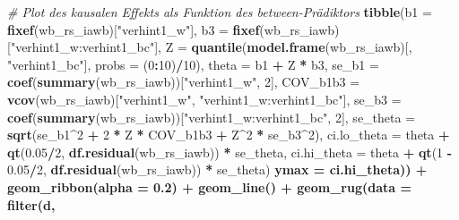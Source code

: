 \documentclass[
]{book}
\newenvironment{Shaded}{\begin{snugshade}}{\end{snugshade}}
\newcommand{\CommentTok}[1]{\textcolor[rgb]{0.56,0.35,0.01}{\textit{#1}}}
\newcommand{\DataTypeTok}[1]{\textcolor[rgb]{0.13,0.29,0.53}{#1}}
\newcommand{\DecValTok}[1]{\textcolor[rgb]{0.00,0.00,0.81}{#1}}
\newcommand{\FloatTok}[1]{\textcolor[rgb]{0.00,0.00,0.81}{#1}}
\newcommand{\KeywordTok}[1]{\textcolor[rgb]{0.13,0.29,0.53}{\textbf{#1}}}
\newcommand{\NormalTok}[1]{#1}
\newcommand{\OperatorTok}[1]{\textcolor[rgb]{0.81,0.36,0.00}{\textbf{#1}}}
\newcommand{\StringTok}[1]{\textcolor[rgb]{0.31,0.60,0.02}{#1}}
\begin{document}
\begin{Shaded}
\begin{Highlighting}[]
\CommentTok{# Plot des kausalen Effekts als Funktion des between-Prädiktors}
\KeywordTok{tibble}\NormalTok{(}\DataTypeTok{b1 =} \KeywordTok{fixef}\NormalTok{(wb_rs_iawb)[}\StringTok{"verhint1_w"}\NormalTok{], }\DataTypeTok{b3 =} \KeywordTok{fixef}\NormalTok{(wb_rs_iawb)[}\StringTok{"verhint1_w:verhint1_bc"}\NormalTok{], }
    \DataTypeTok{Z =} \KeywordTok{quantile}\NormalTok{(}\KeywordTok{model.frame}\NormalTok{(wb_rs_iawb)[, }\StringTok{"verhint1_bc"}\NormalTok{], }\DataTypeTok{probs =}\NormalTok{ (}\DecValTok{0}\OperatorTok{:}\DecValTok{10}\NormalTok{)}\OperatorTok{/}\DecValTok{10}\NormalTok{), }\DataTypeTok{theta =}\NormalTok{ b1 }\OperatorTok{+}\StringTok{ }
\StringTok{        }\NormalTok{Z }\OperatorTok{*}\StringTok{ }\NormalTok{b3, }\DataTypeTok{se_b1 =} \KeywordTok{coef}\NormalTok{(}\KeywordTok{summary}\NormalTok{(wb_rs_iawb))[}\StringTok{"verhint1_w"}\NormalTok{, }\DecValTok{2}\NormalTok{], }\DataTypeTok{COV_b1b3 =} \KeywordTok{vcov}\NormalTok{(wb_rs_iawb)[}\StringTok{"verhint1_w"}\NormalTok{, }
        \StringTok{"verhint1_w:verhint1_bc"}\NormalTok{], }\DataTypeTok{se_b3 =} \KeywordTok{coef}\NormalTok{(}\KeywordTok{summary}\NormalTok{(wb_rs_iawb))[}\StringTok{"verhint1_w:verhint1_bc"}\NormalTok{, }
        \DecValTok{2}\NormalTok{], }\DataTypeTok{se_theta =} \KeywordTok{sqrt}\NormalTok{(se_b1}\OperatorTok{^}\DecValTok{2} \OperatorTok{+}\StringTok{ }\DecValTok{2} \OperatorTok{*}\StringTok{ }\NormalTok{Z }\OperatorTok{*}\StringTok{ }\NormalTok{COV_b1b3 }\OperatorTok{+}\StringTok{ }\NormalTok{Z}\OperatorTok{^}\DecValTok{2} \OperatorTok{*}\StringTok{ }\NormalTok{se_b3}\OperatorTok{^}\DecValTok{2}\NormalTok{), }\DataTypeTok{ci.lo_theta =}\NormalTok{ theta }\OperatorTok{+}\StringTok{ }
\StringTok{        }\KeywordTok{qt}\NormalTok{(}\FloatTok{0.05}\OperatorTok{/}\DecValTok{2}\NormalTok{, }\KeywordTok{df.residual}\NormalTok{(wb_rs_iawb)) }\OperatorTok{*}\StringTok{ }\NormalTok{se_theta, }\DataTypeTok{ci.hi_theta =}\NormalTok{ theta }\OperatorTok{+}\StringTok{ }\KeywordTok{qt}\NormalTok{(}\DecValTok{1} \OperatorTok{-}\StringTok{ }
\StringTok{        }\FloatTok{0.05}\OperatorTok{/}\DecValTok{2}\NormalTok{, }\KeywordTok{df.residual}\NormalTok{(wb_rs_iawb)) }\OperatorTok{*}\StringTok{ }\NormalTok{se_theta) }\OperatorTok{%
    \DataTypeTok{ymax =}\NormalTok{ ci.hi_theta)) }\OperatorTok{+}\StringTok{ }\KeywordTok{geom_ribbon}\NormalTok{(}\DataTypeTok{alpha =} \FloatTok{0.2}\NormalTok{) }\OperatorTok{+}\StringTok{ }\KeywordTok{geom_line}\NormalTok{() }\OperatorTok{+}\StringTok{ }\KeywordTok{geom_rug}\NormalTok{(}\DataTypeTok{data =} \KeywordTok{filter}\NormalTok{(d, }
}
\end{Highlighting}
\end{Shaded}
\end{document}
